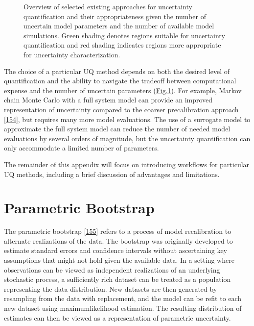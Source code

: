 \documentclass[letterpaper,10pt,english]{sphinxmanual}
\let\sphinxpxdimen\pdfpxdimen\else\newdimen\sphinxpxdimen
\begin{document}
\begin{figure}[htbp]
\centering
\capstart

\noindent\sphinxincludegraphics[width=700\sphinxpxdimen]{{figureA1_1_UQ_approaches}.png}
\caption{Overview of selected existing approaches for uncertainty quantification and their appropriateness given the number of uncertain model parameters and the number of available model simulations. Green shading denotes regions suitable for uncertainty quantification and red shading indicates regions more appropriate for uncertainty characterization.}\label{\detokenize{A1_Uncertainty_Quantification:id13}}\label{\detokenize{A1_Uncertainty_Quantification:figure-a1-1}}\end{figure}

\sphinxAtStartPar
The choice of a particular UQ method depends on both the desired level of quantification and the ability to navigate the tradeoff between computational expense and the number of uncertain parameters (\hyperref[\detokenize{A1_Uncertainty_Quantification:figure-a1-1}]{Fig.\@ \ref{\detokenize{A1_Uncertainty_Quantification:figure-a1-1}}}). For example, Markov chain Monte Carlo with a full system model can provide an improved representation of uncertainty compared to the coarser pre\sphinxhyphen{}calibration approach {[}\hyperlink{cite.index:id37}{154}{]}, but requires many more model evaluations. The use of a surrogate model to approximate the full system model can reduce the number of needed model evaluations by several orders of magnitude, but the uncertainty quantification can only accommodate a limited number of parameters.

\sphinxAtStartPar
The remainder of this appendix will focus on introducing workflows for particular UQ methods, including a brief discussion of advantages and limitations.


\section{Parametric Bootstrap}
\label{\detokenize{A1_Uncertainty_Quantification:parametric-bootstrap}}
\sphinxAtStartPar
The parametric bootstrap {[}\hyperlink{cite.index:id14}{155}{]} refers to a process of model recalibration to alternate realizations of the data. The bootstrap was originally developed to estimate standard errors and confidence intervals without ascertaining key assumptions that might not hold given the available data. In a setting where observations can be viewed as independent realizations of an underlying stochastic process, a sufficiently rich dataset can be treated as a population representing the data distribution. New datasets are then generated by resampling from the data with replacement, and the model can be refit to each new dataset using maximum\sphinxhyphen{}likelihood estimation. The resulting distribution of estimates can then be viewed as a representation of parametric uncertainty.
\end{document}
